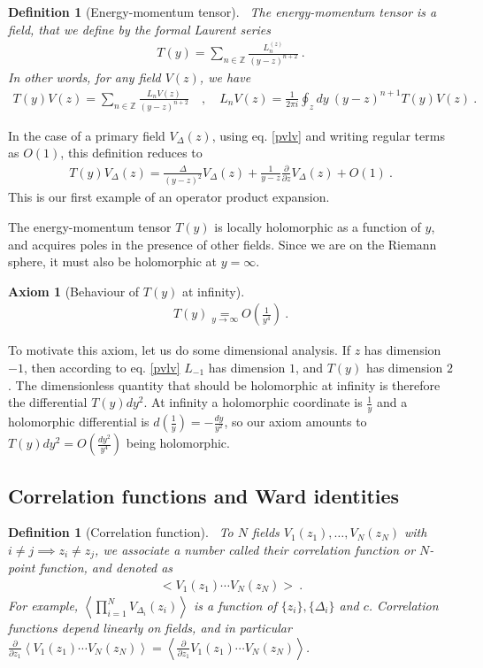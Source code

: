 \documentclass[12pt, a4paper]{article}
\theoremstyle{break}
\newtheorem{hyp}[exo]{Axiom}
\newtheorem{defn}[exo]{Definition}
\begin{document}
\begin{defn}[Energy-momentum tensor]
 ~\label{def:em}
 The energy-momentum tensor is a field, that we define by the formal Laurent series
 \begin{align}
  T(y) = \sum_{n\in\mathbb{Z}} \frac{L_n^{(z)}}{(y-z)^{n+2}} \ .
 \end{align}
In other words, for any field $V(z)$, we have 
\begin{align}
 T(y)V(z) = \sum_{n\in\mathbb{Z}} \frac{L_n V(z)}{(y-z)^{n+2}}\quad , \quad L_n V(z) = \frac{1}{2\pi i} \oint_{z}dy\ (y-z)^{n+1} T(y)V(z)\ .
 \label{eq:lvtv}
\end{align}
\end{defn}
In the case of a primary field $V_\Delta(z)$, using eq. \eqref{pvlv} and writing regular terms as $O(1)$, this definition reduces to
\begin{align}
 T(y)V_\Delta(z) = \frac{\Delta}{(y-z)^2} V_\Delta(z) + \frac{1}{y-z} \frac{\partial}{\partial z} V_\Delta(z) + O(1)\ . 
 \label{eq:tvd}
\end{align}
This is our first example of an operator product expansion.

The energy-momentum tensor $T(y)$ is locally holomorphic as a function of $y$, and acquires poles in the presence of other fields. Since we are on the Riemann sphere, it must also be holomorphic at $y=\infty$. 

\begin{hyp}[Behaviour of $T(y)$ at infinity]
~\label{hyp:ti}
 \begin{align}
 T(y) \underset{y\to\infty} = O\left(\frac{1}{y^4}\right)\ .
 \label{eq:tinf}
\end{align}
\end{hyp}
To motivate this axiom, let us do some dimensional analysis. If $z$ has dimension $-1$, then according to eq. \eqref{pvlv} $L_{-1}$ has dimension $1$, and $T(y)$ has dimension $2$. The dimensionless quantity that should be holomorphic at infinity is therefore the differential $T(y)dy^2$. At infinity a holomorphic coordinate is $\frac{1}{y}$ and a holomorphic differential is $d(\frac{1}{y}) = -\frac{dy}{y^2}$, so our axiom amounts to $T(y)dy^2= O(\frac{dy^2}{y^4})$ being holomorphic.


\subsection{Correlation functions and Ward identities}

\begin{defn}[Correlation function]
~\label{def:cor}
 To $N$ fields $V_1(z_1), \dots ,V_N(z_N)$ with $i\neq j\implies z_i\neq z_j$, we associate a number called their correlation function or $N$-point function, and denoted as 
 \begin{align}
  \Big< V_1(z_1) \cdots V_N(z_N) \Big>\ .
 \end{align}
For example, $\left< \prod_{i=1}^N V_{\Delta_i}(z_i) \right>$ is a function of $\{z_i\}, \{\Delta_i\}$ and $c$.
Correlation functions depend linearly on fields, and in particular $\frac{\partial}{\partial z_1} \left< V_1(z_1) \cdots V_N(z_N) \right> = \left< \frac{\partial}{\partial z_1}V_1(z_1) \cdots V_N(z_N) \right>$.
\end{defn}
\end{document}
